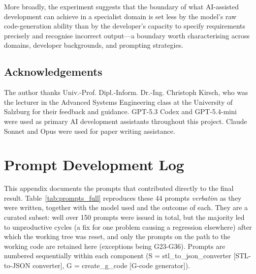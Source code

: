 \documentclass[10pt,twocolumn,a4paper]{article}
\begin{document}
More broadly, the experiment suggests that the boundary of what
AI-assisted development can achieve in a specialist domain is set
less by the model's raw code-generation ability than by the
developer's capacity to specify requirements precisely and
recognise incorrect output—a boundary worth characterising across
domains, developer backgrounds, and prompting strategies.

\subsection*{Acknowledgements}

The author thanks Univ.-Prof. Dipl.-Inform. Dr.-Ing. Christoph Kirsch, who was the lecturer in the Advanced Systems Engineering class at the University of Salzburg for their feedback
and guidance. GPT-5.3 Codex and GPT-5.4-mini were
used as primary AI development assistants throughout this project.
Claude Sonnet and Opus were used for paper writing assistance.

\onecolumn
\appendix
\section{Prompt Development Log}
\label{app:prompts}

This appendix documents the prompts that contributed directly to
the final result. Table~\ref{tab:prompts_full} reproduces these
44 prompts \emph{verbatim} as they were written, together with
the model used and the outcome of each. They are a curated subset:
well over 150 prompts were issued in total, but the majority led
to unproductive cycles (a fix for one problem causing a regression
elsewhere) after which the working tree was reset, and only the
prompts on the path to the working code are retained here (exceptions being G23-G36). 
Prompts are numbered sequentially within each component
(S = stl\_to\_json\_converter [STL-to-JSON converter], G = create\_g\_code [G-code generator]).

\vspace{6pt}
\footnotesize
\setlength{\LTleft}{0pt}
\setlength{\LTright}{0pt}
\end{document}
